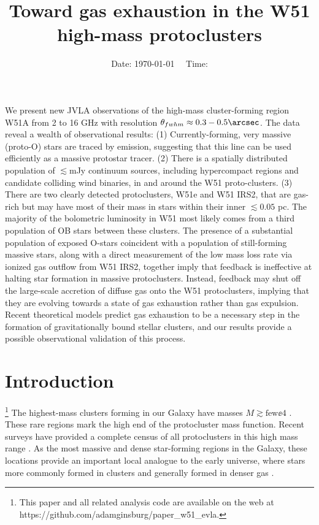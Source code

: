 



\title{Toward gas exhaustion in the W51 high-mass protoclusters}


\date{Date: \today ~~ Time: \currenttime}

\abstract
{
We present new JVLA observations of the high-mass cluster-forming region W51A
from 2 to 16 GHz with resolution
$\theta_{fwhm}\approx0.3-0.5\arcsec$.  The data reveal a wealth of
observational results:
(1) Currently-forming, very massive (proto-O) stars are traced by \ortho
\twotwo emission, suggesting that this line can be used efficiently as a
massive protostar tracer.
(2) There is a spatially distributed population of $\lesssim$mJy continuum sources,
including hypercompact \hii regions and candidate colliding wind binaries,
in and around the W51 proto-clusters.  
(3) There are two clearly detected protoclusters, W51e and W51 IRS2, that are
gas-rich but may have most of their mass in stars within their inner $\lesssim0.05$
pc.  The
majority of the bolometric luminosity in W51 most likely comes from a third
population of OB stars between these clusters.
The presence of a substantial population of exposed O-stars coincident with
a population of still-forming massive stars, along with a direct measurement
of the low mass loss rate via ionized gas outflow from W51 IRS2, together imply
that feedback is ineffective at halting star formation in massive
protoclusters.  Instead, feedback may shut off the large-scale accretion of
diffuse gas onto the W51 protoclusters, implying that they are evolving towards
a state of gas exhaustion rather than gas expulsion. Recent theoretical models
predict gas exhaustion to be a necessary step in the formation of
gravitationally bound stellar clusters, and our results provide a possible
observational validation of this process.
}

\maketitle


\section{Introduction}
\footnote{
This paper and all related analysis code are available on the web at
https://github.com/adamginsburg/paper\_w51\_evla.
}
The highest-mass clusters forming in our Galaxy have masses
$M\gtrsim\textrm{few}\ee{4}$ \msun \citep{Portegies-Zwart2010a}.
These rare regions mark the high end of the protocluster mass function.
Recent surveys have provided a complete census of all protoclusters in this
high mass range \citep{Ginsburg2012a,Urquhart2013b,Urquhart2014b}.  As the
most massive and dense star-forming regions in the Galaxy, these locations
provide an important local analogue to the early universe, where stars more
commonly formed in clusters and generally formed in denser gas
\citep{Kruijssen2012a,Madau2014a}.

